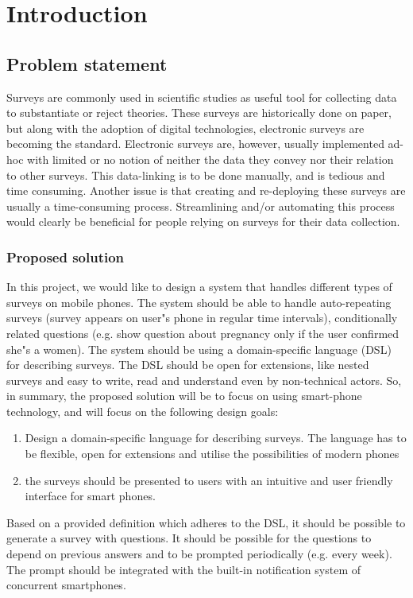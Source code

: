 \chapter{Introduction}
\section{Problem statement}
Surveys are commonly used in scientific studies as useful tool for collecting data to substantiate or reject theories. These surveys are historically done on paper, but along with the adoption of digital technologies, electronic surveys are becoming the standard.
Electronic surveys are, however, usually implemented ad-hoc with limited or no notion of neither the data they convey nor their relation to other surveys. This data-linking is to be done manually, and is tedious and time consuming. Another issue is that creating and re-deploying these surveys are usually a time-consuming process.
Streamlining and/or automating this process would clearly be beneficial for people relying on surveys for their data collection.

\subsection{Proposed solution}
In this project, we would like to design a system that handles different types of surveys on mobile phones. The system should be able to handle auto-repeating surveys (survey appears on user"s phone in regular time intervals), conditionally related questions (e.g. show question about pregnancy only if the user confirmed she"s a women).
The system should be using a domain-specific language (DSL) for describing surveys. The DSL should be open for extensions, like nested surveys and easy to write, read and understand even by non-technical actors.
So, in summary, the proposed solution will be to focus on using smart-phone technology, and will focus on the following design goals:
\begin{enumerate}
  \item Design a domain-specific language for describing surveys. The language has to be flexible, open for extensions and utilise the possibilities of modern phones
  \item the surveys should be presented to users with an intuitive and user friendly interface for smart phones.
\end{enumerate}
Based on a provided definition which adheres to the DSL, it should be possible to generate a survey with questions. It should be possible for the questions to depend on previous answers and to be prompted periodically (e.g. every week). The prompt should be integrated with the built-in notification system of concurrent smartphones.
